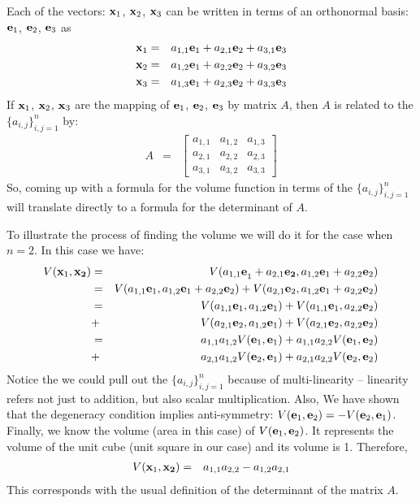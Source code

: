 \documentclass{article}
\begin{document}
Each of the vectors: ${\bf x}_1$, ${\bf x}_2$, ${\bf x}_3$ can be written in
terms of an orthonormal basis: ${\bf e}_1$, ${\bf e}_2$, ${\bf e}_3$ as
\begin{eqnarray*}
  {\bf x}_1 & = & a_{1,1} {\bf e}_1 + a_{2,1} {\bf e}_2 + a_{3,1} {\bf e}_3 \\
  {\bf x}_2 & = & a_{1,2} {\bf e}_1 + a_{2,2} {\bf e}_2 + a_{3,2} {\bf e}_3 \\
  {\bf x}_3 & = & a_{1,3} {\bf e}_1 + a_{2,3} {\bf e}_2 + a_{3,3} {\bf e}_3 \\
\end{eqnarray*}
If ${\bf x}_1$, ${\bf x}_2$, ${\bf x}_3$ are the mapping of
${\bf e}_1$, ${\bf e}_2$, ${\bf e}_3$ by matrix $A$, then $A$ is related to the
$\{a_{i,j}\}_{i,j=1}^n$ by:
\begin{eqnarray}
  A & = & \left[ \begin{array}{ccc}
                   a_{1,1} & a_{1, 2} & a_{1,3} \\
                   a_{2,1} & a_{2, 2} & a_{2,3} \\
                   a_{3,1} & a_{3, 2} & a_{3,3}
                 \end{array} \right]
\end{eqnarray}
So, coming up with a formula for the volume function in terms of the
$\{a_{i,j}\}_{i,j=1}^n$ will
translate directly to a formula for the determinant of $A$.

To illustrate the process of finding the volume we will do it for the case
when $n=2$.
In this case we have:
\begin{eqnarray*}
  V({\bf x}_1, {\bf x_2})
  & = & V({a_{1,1} \bf e}_1 + a_{2, 1} {\bf e_2}, a_{1, 2}{\bf e}_1 + a_{2, 2}{\bf e}_2) \\
  & = & V({a_{1,1} {\bf e}_1}, a_{1, 2}{\bf e}_1 + a_{2, 2}{\bf e}_2)
        + V({a_{2,1} {\bf e}_2}, a_{1, 2}{\bf e}_1 + a_{2, 2}{\bf e}_2) \\
  & = & V(a_{1,1} {\bf e}_1, a_{1,2}{\bf e}_1) + V(a_{1,1} {\bf e}_1, a_{2,2} {\bf e}_2) \\
  & + & V(a_{2,1} {\bf e}_2, a_{1,2}{\bf e}_1) + V(a_{2,1} {\bf e}_2, a_{2,2} {\bf e}_2) \\
  & = & a_{1,1} a_{1,2} V({\bf e}_1, {\bf e}_1) + a_{1,1}a_{2,2} V({\bf e}_1, {\bf e}_2) \\
  & + & a_{2,1} a_{1,2} V({\bf e}_2, {\bf e}_1) + a_{2,1} a_{2,2} V({\bf e}_2, {\bf e}_2)
\end{eqnarray*} 
Notice the we could pull out the $\{a_{i,j}\}_{i,j=1}^n$
because of multi-linearity -- linearity
refers not just to addition, but also scalar multiplication. 
Also, We have shown that the degeneracy condition implies anti-symmetry:
$V({\bf e}_1, {\bf e}_2) = - V({\bf e}_2, {\bf e}_1)$.
Finally, we know the volume (area in this case) of $V({\bf e}_1, {\bf e}_2)$. It
represents the volume of the unit cube (unit square in our case) and its volume is 1.
Therefore,
\begin{eqnarray}
  V({\bf x}_1, {\bf x_2}) & = & a_{1,1} a_{2,2} - a_{1,2} a_{2,1}
\end{eqnarray}
This corresponds with the usual definition of the determinant of the matrix $A$.
\end{document}
